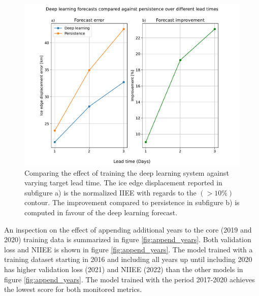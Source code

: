 \documentclass[../main/thesis]{subfiles}
\begin{document}
\begin{figure}
    \centering
    \includegraphics[width=\textwidth]{lead_times.pdf}
    \caption{\label{fig:lead_times}Comparing the effect of training the deep learning system against varying target lead time. The ice edge displacement reported in subfigure a) is the normalized IIEE with regards to the $(> 10\%)$ contour. The improvement compared to persistence in subfigure b) is computed in favour of the deep learning forecast.}
\end{figure}

An inspection on the effect of appending additional years to the core (2019 and 2020) training data is summarized in figure \ref{fig:append_years}. Both validation loss and NIIEE is shown in figure \ref{fig:append_years}. The model trained with a training dataset starting in 2016 and including all years up until including 2020 has higher validation loss (2021) and NIIEE (2022) than the other models in figure \ref{fig:append_years}. The model trained with the period 2017-2020 achieves the lowest score for both monitored metrics.
\end{document}
